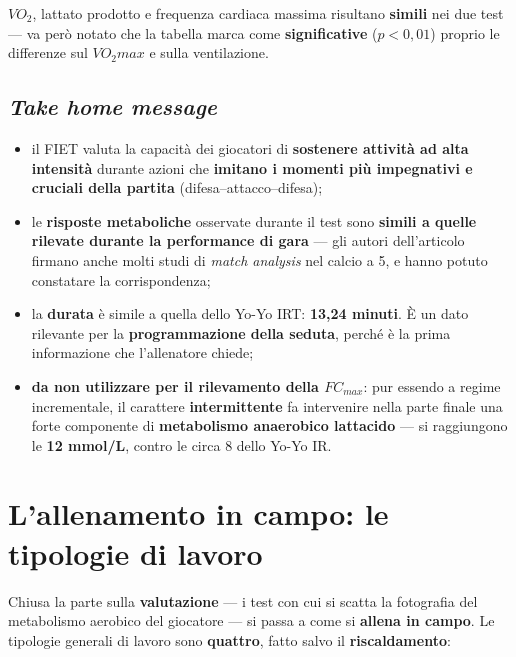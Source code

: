$VO_2$, lattato prodotto e frequenza cardiaca massima risultano \textbf{simili} nei due test --- va
però notato che la tabella marca come \textbf{significative} ($p < 0,01$) proprio le differenze sul
$VO_2max$ e sulla ventilazione.

\subsection{\textit{Take home message}}

\begin{itemize}
  \item il FIET valuta la capacità dei giocatori di \textbf{sostenere attività ad alta intensità}
    durante azioni che \textbf{imitano i momenti più impegnativi e cruciali della partita}
    (difesa--attacco--difesa);
  \item le \textbf{risposte metaboliche} osservate durante il test sono \textbf{simili a quelle
    rilevate durante la performance di gara} --- gli autori dell'articolo firmano anche molti studi
    di \textit{match analysis} nel calcio a 5, e hanno potuto constatare la corrispondenza;
  \item la \textbf{durata} è simile a quella dello Yo-Yo IRT: \textbf{13,24 minuti}. È un dato
    rilevante per la \textbf{programmazione della seduta}, perché è la prima informazione che
    l'allenatore chiede;
  \item \textbf{da non utilizzare per il rilevamento della $FC_{max}$}: pur essendo a regime
    incrementale, il carattere \textbf{intermittente} fa intervenire nella parte finale una forte
    componente di \textbf{metabolismo anaerobico lattacido} --- si raggiungono le \textbf{12
    mmol/L}, contro le circa 8 dello Yo-Yo IR.
\end{itemize}

\section{L'allenamento in campo: le tipologie di lavoro}

Chiusa la parte sulla \textbf{valutazione} --- i test con cui si scatta la fotografia del
metabolismo aerobico del giocatore --- si passa a come si \textbf{allena in campo}. Le tipologie
generali di lavoro sono \textbf{quattro}, fatto salvo il \textbf{riscaldamento}:

